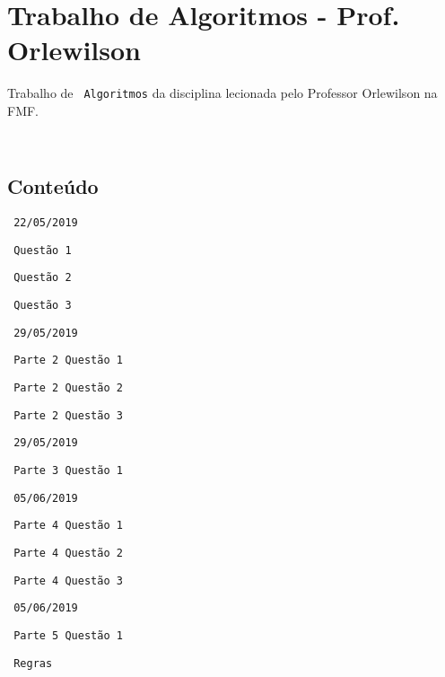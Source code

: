 {\texttt{  }}

\section*{Trabalho de Algoritmos -\/ Prof. Orlewilson}

Trabalho de {\texttt{ Algoritmos}} da disciplina lecionada pelo Professor Orlewilson na F\+MF.

{\texttt{ }}

\subsection*{Conteúdo}


\begin{DoxyItemize}
\item {\texttt{ 22/05/2019}}
\begin{DoxyItemize}
\item {\texttt{ Questão 1}}
\item {\texttt{ Questão 2}}
\item {\texttt{ Questão 3}}
\end{DoxyItemize}
\item {\texttt{ 29/05/2019}}
\begin{DoxyItemize}
\item {\texttt{ Parte 2 Questão 1}}
\item {\texttt{ Parte 2 Questão 2}}
\item {\texttt{ Parte 2 Questão 3}}
\end{DoxyItemize}
\item {\texttt{ 29/05/2019}}
\begin{DoxyItemize}
\item {\texttt{ Parte 3 Questão 1}}
\end{DoxyItemize}
\item {\texttt{ 05/06/2019}}
\begin{DoxyItemize}
\item {\texttt{ Parte 4 Questão 1}}
\item {\texttt{ Parte 4 Questão 2}}
\item {\texttt{ Parte 4 Questão 3}}
\end{DoxyItemize}
\item {\texttt{ 05/06/2019}}
\begin{DoxyItemize}
\item {\texttt{ Parte 5 Questão 1}}
\end{DoxyItemize}
\item {\texttt{ Regras}}
\end{DoxyItemize}

